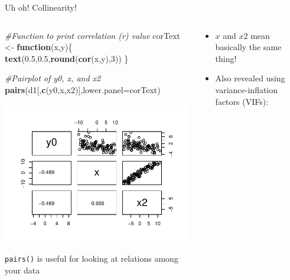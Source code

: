 \documentclass[
  ignorenonframetext,
  aspectratio=169]{beamer}
\newenvironment{Shaded}{\begin{snugshade}}{\end{snugshade}}
\newcommand{\AttributeTok}[1]{\textcolor[rgb]{0.13,0.29,0.53}{#1}}
\newcommand{\CommentTok}[1]{\textcolor[rgb]{0.56,0.35,0.01}{\textit{#1}}}
\newcommand{\ControlFlowTok}[1]{\textcolor[rgb]{0.13,0.29,0.53}{\textbf{#1}}}
\newcommand{\DecValTok}[1]{\textcolor[rgb]{0.00,0.00,0.81}{#1}}
\newcommand{\FloatTok}[1]{\textcolor[rgb]{0.00,0.00,0.81}{#1}}
\newcommand{\FunctionTok}[1]{\textcolor[rgb]{0.13,0.29,0.53}{\textbf{#1}}}
\newcommand{\NormalTok}[1]{#1}
\newcommand{\OtherTok}[1]{\textcolor[rgb]{0.56,0.35,0.01}{#1}}
\newcommand{\StringTok}[1]{\textcolor[rgb]{0.31,0.60,0.02}{#1}}
\providecommand{\tightlist}{%
  \setlength{\itemsep}{0pt}\setlength{\parskip}{0pt}}
\let\oldShaded\Shaded %
\let\endoldShaded\endShaded
\renewenvironment{Shaded}{\scriptsize\oldShaded}{\endoldShaded}
\begin{document}
\begin{frame}[fragile]{Uh oh! Collinearity!}
\protect\hypertarget{uh-oh-collinearity}{}
\begin{columns}[T]
\begin{column}{0.48\textwidth}
\tiny

\begin{Shaded}
\begin{Highlighting}[]
\CommentTok{\#Function to print correlation (r) value}
\NormalTok{corText }\OtherTok{\textless{}{-}} \ControlFlowTok{function}\NormalTok{(x,y)\{}
  \FunctionTok{text}\NormalTok{(}\FloatTok{0.5}\NormalTok{,}\FloatTok{0.5}\NormalTok{,}\FunctionTok{round}\NormalTok{(}\FunctionTok{cor}\NormalTok{(x,y),}\DecValTok{3}\NormalTok{))}
\NormalTok{\} }

\CommentTok{\#Pairplot of y0, x, and x2}
\FunctionTok{pairs}\NormalTok{(d1[,}\FunctionTok{c}\NormalTok{(}\StringTok{\textquotesingle{}y0\textquotesingle{}}\NormalTok{,}\StringTok{\textquotesingle{}x\textquotesingle{}}\NormalTok{,}\StringTok{\textquotesingle{}x2\textquotesingle{}}\NormalTok{)],}\AttributeTok{lower.panel=}\NormalTok{corText)}
\end{Highlighting}
\end{Shaded}

\includegraphics{03-Lecture_files/figure-beamer/unnamed-chunk-51-1.pdf}

\normalsize

\texttt{pairs()} is useful for looking at relations among your data
\end{column}

\begin{column}{0.48\textwidth}
\begin{itemize}[<+->]
\tightlist
\item
  \(x\) and \(x2\) mean basically the same thing!
\item
  Also revealed using variance-inflation factors (VIFs):
\end{itemize}


\end{column}
\end{columns}
\end{frame}
\end{document}
